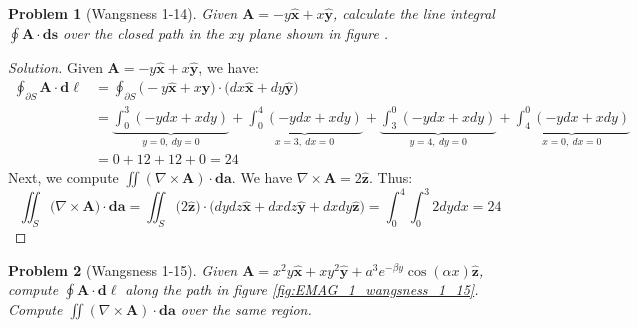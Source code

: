 \documentclass{article}
\theoremstyle{mystyle}
\newtheorem{problem}{Problem}[section]
\begin{document}
\begin{problem}[Wangsness 1-14]
\label{problem:EMAG_1_wangsness_1_14}
Given $\mathbf{A} = -y\hat{\mathbf{x}}+x\hat{\mathbf{y}}$, calculate the line integral $\oint \mathbf{A}\cdot \mathbf{ds}$ over the closed path in the $xy$ plane shown in figure .
\end{problem}
\begin{proof}[Solution]
Given $\mathbf{A} = -y\hat{\mathbf{x}}+x\hat{\mathbf{y}}$, we have:
\begin{align*}
    \oint_{\partial S}\mathbf{A}\cdot\boldsymbol{d\ell}&=\oint_{\partial S}\big(-y\hat{\mathbf{x}}+x\hat{\mathbf{y}}\big)\cdot\big(dx\hat{\mathbf{x}}+dy\hat{\mathbf{y}}\big)\\
    &=\underbrace{\int_{0}^{3}(-ydx+xdy)}_{y=0,\ dy=0}+\underbrace{\int_{0}^{4}(-ydx+xdy)}_{x=3,\ dx=0}+\underbrace{\int_{3}^{0}(-ydx+xdy)}_{y =4,\ dy=0}+\underbrace{\int_{4}^{0}(-ydx+xdy)}_{x=0,\ dx=0}\\
    &=0+12+12+0=24
\end{align*}
Next, we compute $\iint(\nabla\times\mathbf{A})\cdot\boldsymbol{da}$. We have $\nabla\times\mathbf{A}=2\hat{\mathbf{z}}$. Thus:
\begin{equation*}
    \iint_{S}\big(\nabla\times\mathbf{A}\big)\cdot\boldsymbol{da}=\iint_{S}\big(2\hat{\mathbf{z}}\big)\cdot \big(dydz\hat{\mathbf{x}}+dxdz\hat{\mathbf{y}}+dxdy\hat{\mathbf{z}}\big)=\int_{0}^{4}\int_{0}^{3}2dydx=24
\end{equation*}
\end{proof}
\begin{problem}[Wangsness 1-15]
\label{problem:EMAG_1_wangsness_1_15}
Given $\mathbf{A} = x^{2}y\hat{\mathbf{x}}+xy^{2}\hat{\mathbf{y}}+a^{3}e^{-\beta y}\cos(\alpha x)\hat{\mathbf{z}}$, compute $\oint \mathbf{A}\cdot \boldsymbol{d\ell}$ along the path in figure \ref{fig:EMAG_1_wangsness_1_15}. Compute $\iint (\nabla \times \mathbf{A})\cdot \boldsymbol{da}$ over the same region.
\end{problem}
\end{document}
